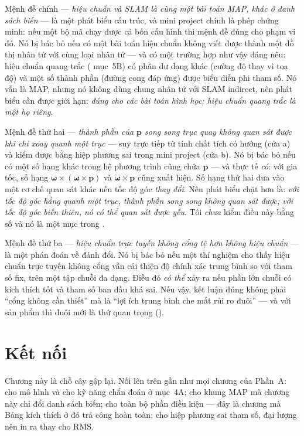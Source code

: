 \documentclass[../../vslam.tex]{subfiles}
\begin{document}
Mệnh đề chính --- \emph{hiệu chuẩn và SLAM là cùng một bài toán MAP, khác ở danh sách biến} --- là một phát biểu cấu trúc, và mini project chính là phép chứng minh: nếu một bộ mã chạy được cả bốn cấu hình thì mệnh đề đúng cho phạm vi đó. Nó bị bác bỏ nếu có một bài toán hiệu chuẩn không viết được thành một đồ thị nhân tử với cùng loại nhân tử --- và có một trường hợp như vậy đáng nêu: hiệu chuẩn quang trắc ( mục~5B) có phần dư dạng khác (cường độ thay vì toạ độ) và một số thành phần (đường cong đáp ứng) được biểu diễn phi tham số. Nó vẫn là MAP, nhưng nó không dùng chung nhân tử với SLAM indirect, nên phát biểu cần được giới hạn: \emph{đúng cho các bài toán hình học; hiệu chuẩn quang trắc là một họ riêng}.

Mệnh đề thứ hai --- \emph{thành phần của \(\mathbf{p}\) song song trục quay không quan sát được khi chỉ xoay quanh một trục} --- suy trực tiếp từ tính chất tích có hướng (cửa a) và kiểm được bằng hiệp phương sai trong mini project (cửa b). Nó bị bác bỏ nếu có một số hạng khác trong hệ phương trình cũng chứa \(\mathbf{p}\) --- và thực tế \emph{có}: với gia tốc, số hạng \(\boldsymbol{\omega}\times(\boldsymbol{\omega}\times\mathbf{p})\) và \(\dot{\boldsymbol{\omega}}\times\mathbf{p}\) cũng xuất hiện. Số hạng thứ hai đưa vào một cơ chế quan sát khác nếu tốc độ góc \emph{thay đổi}. Nên phát biểu chặt hơn là: \emph{với tốc độ góc hằng quanh một trục, thành phần song song không quan sát được; với tốc độ góc biến thiên, nó có thể quan sát được yếu}. Tôi \emph{chưa} kiểm điều này bằng số và nó là một mục trong .

Mệnh đề thứ ba --- \emph{hiệu chuẩn trực tuyến không cổng tệ hơn không hiệu chuẩn} --- là một phán đoán về đánh đổi. Nó bị bác bỏ nếu một thí nghiệm cho thấy hiệu chuẩn trực tuyến không cổng vẫn cải thiện độ chính xác trung bình so với tham số fix, trên một tập chuỗi đa dạng. Điều đó \emph{có thể} xảy ra nếu phần lớn chuỗi có kích thích tốt và tham số ban đầu khá sai. Nếu vậy, kết luận đúng không phải ``cổng không cần thiết'' mà là ``lợi ích trung bình che mất rủi ro đuôi'' --- và với sản phẩm thì đuôi mới là thứ quan trọng ().

\section{Kết nối}

Chương này là chỗ cây gập lại. Nối lên trên gần như mọi chương của Phần~A:  cho mô hình và cho kỹ năng chẩn đoán ở mục~4A;  cho khung MAP mà chương này chỉ đổi danh sách biến;  cho toàn bộ phần điều kiện --- đây là chương mà Bảng kích thích ở đó trả công hoàn toàn;  cho hiệp phương sai tham số, đại lượng nên in ra thay cho RMS.
\end{document}

